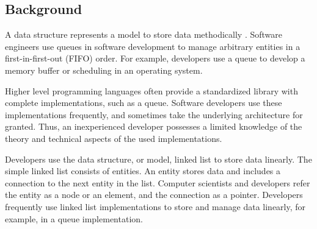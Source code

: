\documentclass[a4paper,11pt]{kth-mag}
\newcommand*{\skippara}{\par\vspace{\baselineskip} \noindent}
\begin{document}
\subsection{Background}\label{sec:background}
A data structure represents a model to store data methodically \cite{deshpande2004c}.
Software engineers use queues in software development to manage arbitrary entities in a first-in-first-out (FIFO) order.
For example, developers use a queue to develop a memory buffer or scheduling in an operating system.

\skippara Higher level programming languages often provide a standardized library with complete implementations, such as a queue.
Software developers use these implementations frequently, and sometimes take the underlying architecture for granted.
Thus, an inexperienced developer possesses a limited knowledge of the theory and technical aspects of the used implementations.

\skippara Developers use the data structure, or model, linked list to store data linearly.
The simple linked list consists of entities.
An entity stores data and includes a connection to the next entity in the list.
Computer scientists and developers refer the entity as a node or an element, and the connection as a pointer.
Developers frequently use linked list implementations to store and manage data linearly, for example, in a queue implementation.


\end{document}
